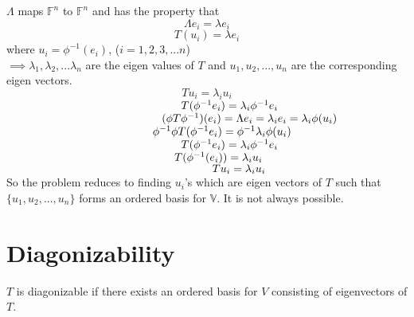 \documentclass[12pt]{article}
\theoremstyle{definition}
\begin{document}
  $ \Lambda $ maps $ \mathbb{F}^{n} $ to $ \mathbb{F}^{n} $ and has the property that $$\Lambda e_{i}=\lambda e_{i} $$ $$T( u_{i})=\lambda e_{i} $$ where $ u_{i}=\phi^{-1}(e_{i}) $, ($ i=1,2,3,...n $)\\$ \implies \lambda_{1}, \lambda_{2} ,...\lambda_{n} $ are the eigen values of $ T $ and $ u_{1},u_{2},...,u_{n} $ are the corresponding eigen vectors. \\$$ Tu_{i}=\lambda_{i}u_{i} $$ $ \hspace*{5.5cm} T(\phi^{-1}e_{i})=\lambda_{i}\phi^{-1}e_{i} $\\$ \hspace*{4.9cm} (\phi T \phi^{-1})(e_{i})=\Lambda e_{i}=\lambda_{i}e_{i}=\lambda_{i}\phi(u_{i}) $\\ $ \hspace*{4.6cm} \phi^{-1}\phi T(\phi^{-1}e_{i})=\phi^{-1}\lambda_{i}\phi (u_{i}) $\\$ \hspace*{5.5cm} T(\phi^{-1}e_{i})=\lambda_{i}\phi^{-1}e_{i}
  $\\$ \hspace*{5.3cm} T(\phi^{-1}(e_{i}))=\lambda_{i}u_{i} $\\$\hspace*{6.5cm} Tu_{i}=\lambda_{i}u_{i} $\\
  So the problem reduces to finding $u_{i}$'s which are eigen vectors of $ T $ such that $ \{u_{1},u_{2},...,u_{n}\} $ forms an ordered basis for $ \mathbb{V} $. It is not always possible.
	  \section{Diagonizability}
	  $T$ is diagonizable if there exists an ordered basis for $V$ consisting of eigenvectors of $T$.
\end{document}
